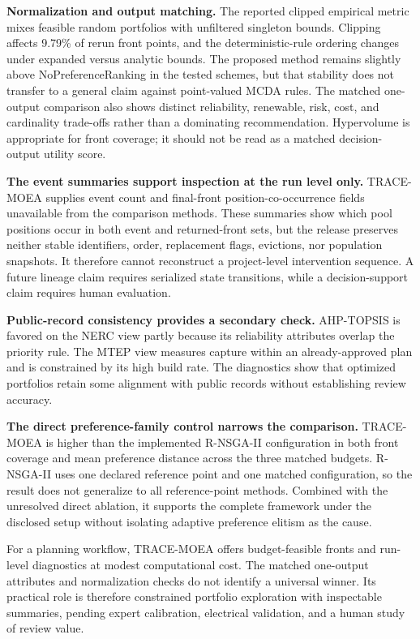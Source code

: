 \documentclass[energies,article,submit,moreauthors]{Definitions/mdpi}
\begin{document}
\textbf{Normalization and output matching.} The reported clipped empirical metric mixes feasible random portfolios with unfiltered singleton bounds. Clipping affects 9.79\% of rerun front points, and the deterministic-rule ordering changes under expanded versus analytic bounds. The proposed method remains slightly above NoPreferenceRanking in the tested schemes, but that stability does not transfer to a general claim against point-valued MCDA rules. The matched one-output comparison also shows distinct reliability, renewable, risk, cost, and cardinality trade-offs rather than a dominating recommendation. Hypervolume is appropriate for front coverage; it should not be read as a matched decision-output utility score.

\textbf{The event summaries support inspection at the run level only.} TRACE-MOEA supplies event count and final-front position-co-occurrence fields unavailable from the comparison methods. These summaries show which pool positions occur in both event and returned-front sets, but the release preserves neither stable identifiers, order, replacement flags, evictions, nor population snapshots. It therefore cannot reconstruct a project-level intervention sequence. A future lineage claim requires serialized state transitions, while a decision-support claim requires human evaluation.

\textbf{Public-record consistency provides a secondary check.} AHP-TOPSIS is favored on the NERC view partly because its reliability attributes overlap the priority rule. The MTEP view measures capture within an already-approved plan and is constrained by its high build rate. The diagnostics show that optimized portfolios retain some alignment with public records without establishing review accuracy.

\textbf{The direct preference-family control narrows the comparison.} TRACE-MOEA is higher than the implemented R-NSGA-II configuration in both front coverage and mean preference distance across the three matched budgets. R-NSGA-II uses one declared reference point and one matched configuration, so the result does not generalize to all reference-point methods. Combined with the unresolved direct ablation, it supports the complete framework under the disclosed setup without isolating adaptive preference elitism as the cause.

For a planning workflow, TRACE-MOEA offers budget-feasible fronts and run-level diagnostics at modest computational cost. The matched one-output attributes and normalization checks do not identify a universal winner. Its practical role is therefore constrained portfolio exploration with inspectable summaries, pending expert calibration, electrical validation, and a human study of review value.
\end{document}
